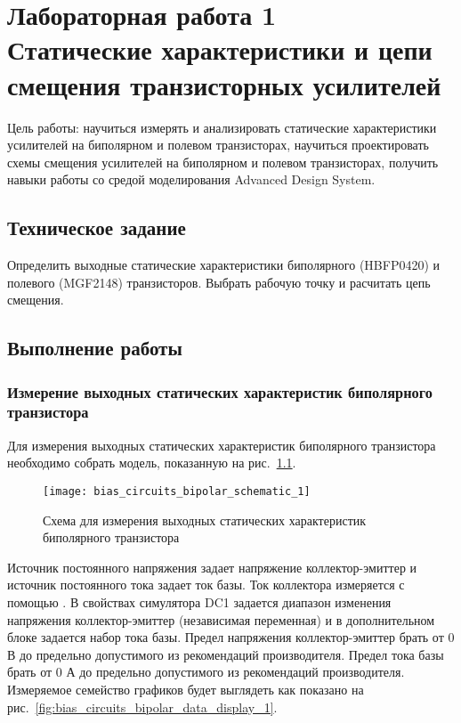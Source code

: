 \chapter{Лабораторная работа 1 \\
Статические характеристики и цепи смещения транзисторных усилителей}

Цель работы: научиться измерять и анализировать статические характеристики усилителей на биполярном и полевом транзисторах, научиться проектировать схемы смещения усилителей на биполярном и полевом транзисторах, получить навыки работы со средой моделирования Advanced Design System.

\section{Техническое задание}

Определить выходные статические характеристики биполярного (HBFP0420) и полевого (MGF2148) транзисторов. Выбрать рабочую точку и расчитать цепь смещения.

\section{Выполнение работы}

\subsection{Измерение выходных статических характеристик биполярного транзистора}

Для измерения выходных статических характеристик биполярного транзистора необходимо собрать модель, показанную на рис.~\ref{fig:bias_circuits_bipolar_schematic_1}.

\begin{figure}
    \centering
    \texttt{[image: bias\_circuits\_bipolar\_schematic\_1]}
    \caption{Схема для измерения выходных статических характеристик биполярного транзистора}%
    \label{fig:bias_circuits_bipolar_schematic_1}
\end{figure}

Источник постоянного напряжения  задает напряжение коллектор-эмиттер и источник постоянного тока  задает ток базы.
Ток коллектора измеряется с помощью .
В свойствах симулятора DC1 задается диапазон изменения напряжения коллектор-эмиттер (независимая переменная) и в дополнительном блоке  задается набор тока базы.
Предел напряжения коллектор-эмиттер брать от 0 В до предельно допустимого из рекомендаций производителя. Предел тока базы брать от 0 А до предельно допустимого из рекомендаций производителя.
Измеряемое семейство графиков будет выглядеть как показано на рис.~\ref{fig:bias_circuits_bipolar_data_display_1}.

